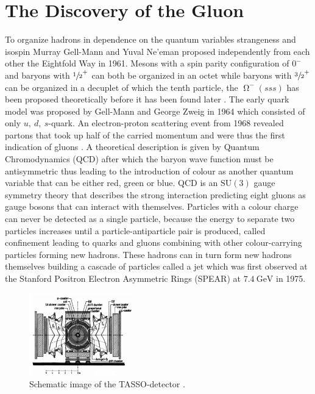 \chapter{The Discovery of the Gluon}

To organize hadrons in dependence on the quantum variables strangeness and isospin Murray Gell-Mann and Yuval Ne'eman proposed independently from each other the Eightfold Way in 1961.
Mesons with a spin parity configuration of $0^-$ and baryons with $\sfrac 12^+$ can both be organized in an octet while baryons with $\sfrac 32^+$ can be organized in a decuplet of which the tenth particle, the $\upOmega^-(sss)$ has been proposed theoretically before it has been found later \cite{Fritzsch2018}.
The early quark model was proposed by Gell-Mann and George Zweig in 1964 which consisted of only $u,\ d,\ s$-quark.
An electron-proton scattering event from 1968 revealed partons that took up half of the carried momentum and were thus the first indication of gluons \cite{Venker}.
A theoretical description is given by Quantum Chromodynamics (QCD) after which the baryon wave function must be antisymmetric thus leading to the introduction of colour as another quantum variable that can be either red, green or blue.
QCD is an $\text{SU}(3)$ gauge symmetry theory that describes the strong interaction predicting eight gluons as gauge bosons that can interact with themselves.
Particles with a colour charge can never be detected as a single particle, because the energy to separate two particles increases until a particle-antiparticle pair is produced, called confinement leading to quarks and gluons combining with other colour-carrying particles forming new hadrons.
These hadrons can in turn form new hadrons themselves building a cascade of particles called a jet which was first observed at the Stanford Positron Electron Asymmetric Rings (SPEAR) at $\SI{7.4}{\giga\eV}$ in 1975.
\begin{figure}
    \centering
    \includegraphics[width=0.4\textwidth]{figs/TASSO.png}
    \caption{Schematic image of the TASSO-detector \cite{TASSO:1979xej}.}
    \label{fig:TASSO}
\end{figure}

